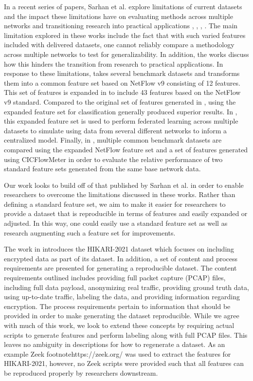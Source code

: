 \documentclass[conference]{IEEEtran}
\begin{document}
In a recent series of papers, Sarhan et al. explore limitations of current datasets and the impact these limitations have on evaluating methods across multiple networks and transitioning research into practical applications \cite{sarhan2020netflow}, \cite{sarhan2021cyber}, \cite{Sarhan2021}, \cite{sarhan_arxiv2021}.
The main limitation explored in these works include the fact that with such varied features included with delivered datasets, one cannot reliably compare a methodology across multiple networks to test for generalizability.
In addition, the works discuss how this hinders the transition from research to practical applications. 
In response to these limitations, \cite{sarhan2020netflow} takes several benchmark datasets and transforms them into a common feature set based on NetFlow v9 consisting of 12 features.
This set of features is expanded in \cite{Sarhan2021} to include 43 features based on the NetFlow v9 standard.
Compared to the original set of features generated in \cite{sarhan2020netflow}, using the expanded feature set for classification generally produced superior results.
In \cite{sarhan2021cyber}, this expanded feature set is used to perform federated learning across multiple datasets to simulate using data from several different networks to inform a centralized model.
Finally, in \cite{sarhan_arxiv2021}, multiple common benchmark datasets are compared using the expanded NetFlow feature set and a set of features generated using CICFlowMeter \cite{lashkari2017characterization} in order to evaluate the relative performance of two standard feature sets generated from the same base network data.

Our work looks to build off of that published by Sarhan et al. in order to enable researchers to overcome the limitations discussed in these works.
Rather than defining a standard feature set, we aim to make it easier for researchers to provide a dataset that is reproducible in terms of features and easily expanded or adjusted.
In this way, one could easily use a standard feature set as well as research augmenting such a feature set for improvements.

The work in \cite{ferriyan2021} introduces the HIKARI-2021 dataset which focuses on including encrypted data as part of its dataset.
In addition, a set of content and process requirements are presented for generating a reproducible dataset.
The content requirements outlined includes providing full packet capture (PCAP) files, including full data payload, anonymizing real traffic,  providing ground truth data, using up-to-date traffic, labeling the data, and providing information regarding encryption.
The process requirements pertain to information that should be provided in order to make generating the dataset reproducible.
While we agree with much of this work, we look to extend these concepts by requiring actual scripts to generate features and perform labeling along with full PCAP files.
This leaves no ambiguity in descriptions for how to regenerate a dataset.
As an example Zeek footnote{https://zeek.org/} was used to extract the features for HIKARI-2021, however, no Zeek scripts were provided such that all features can be reproduced properly by researchers downstream.
\end{document}
